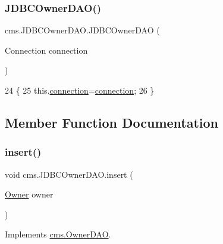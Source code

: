 \subsubsection{\texorpdfstring{J\+D\+B\+C\+Owner\+D\+A\+O()}{JDBCOwnerDAO()}}
{\footnotesize\ttfamily cms.\+J\+D\+B\+C\+Owner\+D\+A\+O.\+J\+D\+B\+C\+Owner\+D\+AO (\begin{DoxyParamCaption}\item[{Connection}]{connection }\end{DoxyParamCaption})\hspace{0.3cm}{\ttfamily [inline]}}


\begin{DoxyCode}
24                                               \{
25          this.\mbox{\hyperlink{classcms_1_1_j_d_b_c_owner_d_a_o_a76b8cb63ccf288ce8ca2f767a045372c}{connection}}=\mbox{\hyperlink{classcms_1_1_j_d_b_c_owner_d_a_o_a76b8cb63ccf288ce8ca2f767a045372c}{connection}};
26     \}
\end{DoxyCode}


\subsection{Member Function Documentation}
\mbox{\label{classcms_1_1_j_d_b_c_owner_d_a_o_ad0540f3f132d78562a11afe2bf30cd29}} 
\subsubsection{\texorpdfstring{insert()}{insert()}}
{\footnotesize\ttfamily void cms.\+J\+D\+B\+C\+Owner\+D\+A\+O.\+insert (\begin{DoxyParamCaption}\item[{\mbox{\hyperlink{classcms_1_1_owner}{Owner}}}]{owner }\end{DoxyParamCaption})\hspace{0.3cm}{\ttfamily [inline]}}



Implements \mbox{\hyperlink{interfacecms_1_1_owner_d_a_o_ad8e659635fa64791942d5377077bedfd}{cms.\+Owner\+D\+AO}}.


